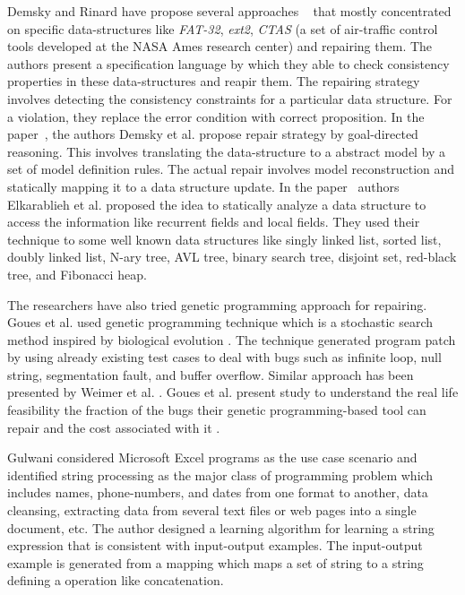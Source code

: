 Demsky and Rinard have propose several approaches  ~\cite{
Demsky03automaticdata, conf/issre/DemskyR03,conf/oopsla/DemskyR03,
conf/issta/DemskyEGMPR06} that mostly concentrated on specific
data-structures like \emph{FAT-32}, \emph{ext2}, \emph{CTAS} (a set of
air-traffic control tools developed at the NASA Ames research center) and
repairing them. The authors present a specification language by which they
able to check consistency properties in these data-structures and reapir them.
The repairing strategy involves detecting the consistency constraints for a
particular data structure. For a violation, they replace the error condition
with correct proposition. In the paper~\cite{conf/icse/DemskyR05}, the authors
Demsky et al. propose repair strategy by goal-directed reasoning. This involves
translating the data-structure to a abstract model by a set of model definition
rules. The actual repair involves model reconstruction and statically mapping it
to a data structure update. In the paper~\cite{conf/oopsla/2007} authors
Elkarablieh et al. proposed the idea to statically analyze a data structure to
access the information like recurrent fields and local fields. They used their
technique to some well known data structures like singly linked list, sorted
list, doubly linked list, N-ary tree, AVL tree, binary search tree, disjoint set,
red-black tree, and Fibonacci heap.

The researchers have also tried genetic programming approach for repairing.
Goues et al. used genetic programming technique which is a stochastic search
method inspired by biological evolution \cite{GouesNFW12}. The technique generated program patch
by using already existing test cases to deal with bugs such as infinite loop, null
string, segmentation fault, and buffer overflow. Similar approach has been presented by 
Weimer et al. \cite{WeimerFGN10}. Goues et al. present study to understand the real life feasibility
the fraction of the bugs their genetic programming-based tool can repair and the cost associated
with it \cite{GouesDFW12}.

Gulwani \cite{Gulwani:2011} considered Microsoft Excel programs as the use case scenario and
identified string processing as the major class of programming problem which
includes names, phone-numbers, and dates from one format to another, data cleansing,
extracting data from several text files or web pages into a single document,
etc. The author designed a learning algorithm for learning a string expression
that is consistent with input-output examples. The input-output example is
generated from a mapping which maps a set of string to a string defining a
operation like concatenation.

